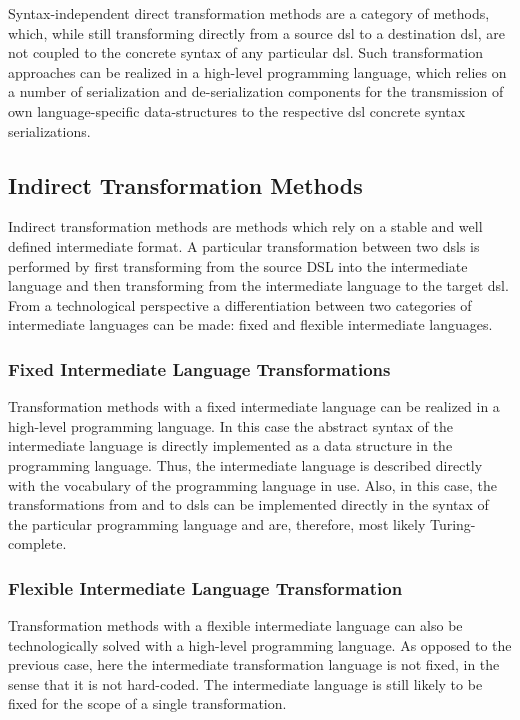 Syntax-independent direct transformation methods are a category of methods, which, while still transforming directly from a source \gls{dsl} to a destination \gls{dsl}, are not coupled to the concrete syntax of any particular \gls{dsl}. Such transformation approaches can be realized in a high-level programming language, which relies on a number of serialization and de-serialization components for the transmission of own language-specific data-structures to the respective \gls{dsl} concrete syntax serializations.

\subsection{Indirect Transformation Methods}

Indirect transformation methods are methods which rely on a stable and well defined intermediate format. A particular transformation between two \glspl{dsl} is performed by first transforming from the source DSL into the intermediate language and then transforming from the intermediate language to the target \gls{dsl}. From a technological perspective a differentiation between two categories of intermediate languages can be made: fixed and flexible intermediate languages.

\subsubsection{Fixed Intermediate Language Transformations}

Transformation methods with a fixed intermediate language can be realized in a high-level programming language. In this case the abstract syntax of the intermediate language is directly implemented as a data structure in the programming language. Thus, the intermediate language is described directly with the vocabulary of the programming language in use. Also, in this case, the transformations from and to \glspl{dsl} can be implemented directly in the syntax of the particular programming language and are, therefore, most likely Turing-complete.

\subsubsection{Flexible Intermediate Language Transformation}

Transformation methods with a flexible intermediate language can also be technologically solved with a high-level programming language. As opposed to the previous case, here the intermediate transformation language is not fixed, in the sense that it is not hard-coded. The intermediate language is still likely to be fixed for the scope of a single transformation.

